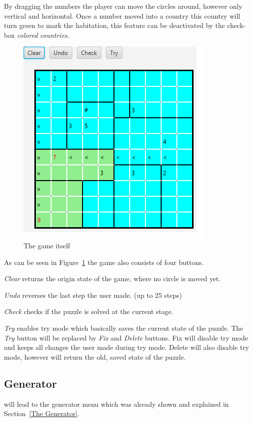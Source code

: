 By dragging the numbers the player can move the circles around, however only vertical and horizontal. Once a number moved into a country this country will turn green to mark the habitation, this feature can be deactivated by the check-box \emph{colored countries}.
\begin{figure}
  \centering
  \includegraphics[scale=1]{Pictures/game.png} 
  \caption{The game itself}
  \label{fig:game}
\end{figure}
As can be seen in Figure~\ref{fig:game} the game also consists of four buttons.

\emph{Clear} returns the origin state of the game, where no circle is moved yet.

\emph{Undo} reverses the last step the user made. (up to 25 steps)

\emph{Check} checks if the puzzle is solved at the current stage.

\emph{Try} enables try mode which basically saves the current state of the puzzle. The \emph{Try} button will be replaced by \emph{Fix} and \emph{Delete} buttons. Fix will disable try mode and keeps all changes the user made during try mode. Delete will also disable try mode, however will return the old, saved state of the puzzle.

\subsection{Generator} will lead to the generator menu which was already shown and explained in Section~\ref{The Generator}.

